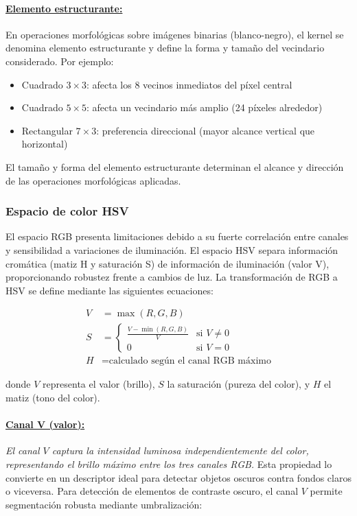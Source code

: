 \paragraph{\underline{Elemento estructurante:}} En operaciones morfológicas sobre imágenes binarias (blanco-negro), el kernel se denomina elemento estructurante y define la forma y tamaño del vecindario considerado. Por ejemplo:
\begin{itemize}[label=$\bullet$]
\item Cuadrado $3 \times 3$: afecta los 8 vecinos inmediatos del píxel central
\item Cuadrado $5 \times 5$: afecta un vecindario más amplio (24 píxeles alrededor)
\item Rectangular $7 \times 3$: preferencia direccional (mayor alcance vertical que horizontal)
\end{itemize}

El tamaño y forma del elemento estructurante determinan el alcance y dirección de las operaciones morfológicas aplicadas.

\subsubsection{Espacio de color HSV}

El espacio RGB presenta limitaciones debido a su fuerte correlación entre canales y sensibilidad a variaciones de iluminación. El espacio HSV separa información cromática (matiz H y saturación S) de información de iluminación (valor V), proporcionando robustez frente a cambios de luz. La transformación de RGB a HSV se define mediante las siguientes ecuaciones:

\begin{align}
V &= \max(R, G, B) \\
S &= \begin{cases}
\frac{V - \min(R,G,B)}{V} & \text{si } V \neq 0 \\
0 & \text{si } V = 0
\end{cases} \\
H &= \text{calculado según el canal RGB máximo}
\end{align}

donde $V$ representa el valor (brillo), $S$ la saturación (pureza del color), y $H$ el matiz (tono del color).

\paragraph{\underline{Canal V (valor):}} \textit{El canal $V$ captura la intensidad luminosa independientemente del color, representando el brillo máximo entre los tres canales RGB.} Esta propiedad lo convierte en un descriptor ideal para detectar objetos oscuros contra fondos claros o viceversa. Para detección de elementos de contraste oscuro, el canal $V$ permite segmentación robusta mediante umbralización:

